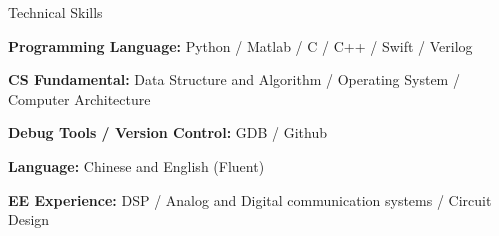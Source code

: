 \documentclass[letterpaper]{resume} %
\begin{document}
\begin{rSection}{Technical Skills}

\begin{rSubsection}{}{}{}{}
\vspace{-0.6\baselineskip}
\item {\bfseries{Programming Language:}} Python / Matlab / C / C++ / Swift / Verilog
\item {\bfseries{CS Fundamental:}} Data Structure and Algorithm / Operating System / Computer Architecture
\item {\bfseries{Debug Tools / Version Control:}} GDB / Github 
\item {\bfseries{Language:}} Chinese and English (Fluent)
\item {\bfseries{EE Experience:}} DSP / Analog and Digital communication systems / Circuit Design
\end{rSubsection}

\end{rSection}
\vspace{-0.6\baselineskip}

\end{document}
